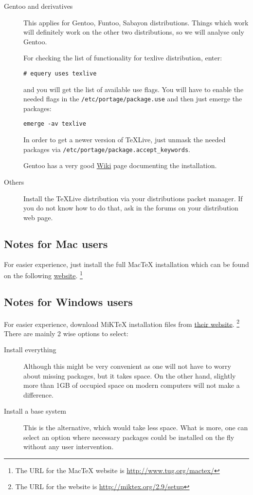 \documentclass[a4paper]{article}
\newcommand{\MiKTeX}{MiK\TeX}
\newcommand{\MacTeX}{Mac\TeX}
\newcommand{\TeXLive}{\TeX Live}
\begin{document}
\begin{description}
    \item[Gentoo and derivatives]
        This applies for Gentoo, Funtoo, Sabayon distributions. Things which
        work will definitely work on the other two distributions, so we will
        analyse only Gentoo.

        For checking the list of functionality for texlive distribution, enter:
\begin{verbatim}
# equery uses texlive
\end{verbatim}
        and you will get the list of available use flags.
        You will have to enable the needed flags in the
        \verb|/etc/portage/package.use| and then just emerge the packages:
\begin{verbatim}
emerge -av texlive
\end{verbatim}
        In order to get a newer version of \TeXLive, just unmask the needed
        packages via \verb|/etc/portage/package.accept_keywords|.

        Gentoo has a very good
        \href{http://www.gentoo.org/proj/en/tex/texlive-migration-guide.xml}{Wiki}
        page documenting the installation.
    \item[Others]
        Install the \TeX Live distribution via your distributions packet
        manager. If you do not know how to do that, ask in the forums on your
        distribution web page.
\end{description}

\subsection{Notes for Mac users}

For easier experience, just install the full \MacTeX{} installation which can be
found on the following \href{http://www.tug.org/mactex/}{website}.
\footnote{The URL for the \MacTeX{} website is \url{http://www.tug.org/mactex/}}

\subsection{Notes for Windows users}

For easier experience, download \MiKTeX{} installation files from
\href{http://miktex.org/2.9/setup}{their website}.
\footnote{The URL for the website is \url{http://miktex.org/2.9/setup}}
There are mainly 2 wise options to select:
\begin{description}
    \item[Install everything] Although this might be very convenient as
        one will not have to worry about missing packages, but it takes space.
        On the other hand, slightly more than 1GB of occupied space on modern
        computers will not make a difference.
    \item[Install a base system] This is the alternative, which would take less
        space. What is more, one can select an option where necessary packages
        could be installed on the fly without any user intervention.
\end{description}
\end{document}
